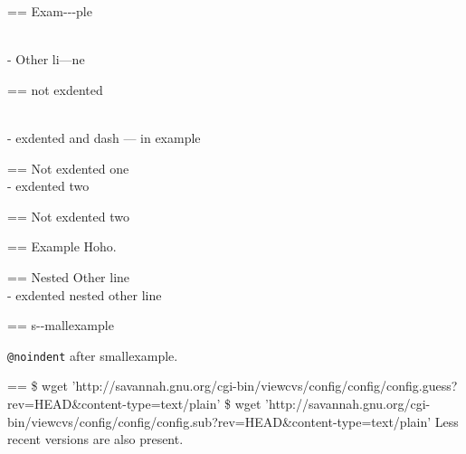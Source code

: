 \documentclass{book}
\makeatletter
\newenvironment{Texinfopreformatted}{%
  \par\GNUTobeylines\obeyspaces\frenchspacing\parskip=\z@\parindent=\z@}{}
{\catcode`\^^M=13 \gdef\GNUTobeylines{\catcode`\^^M=13 \def^^M{\null\par}}}
\newenvironment{Texinfoindented}{\begin{list}{}{}\item\relax}{\end{list}}
\renewcommand{\_}{\Texinfounderscore\discretionary{}{}{}}
\makeatother
\begin{document}
\begin{titlepage}
\begin{Texinfoindented}
\begin{Texinfopreformatted}%
\ttfamily Exam{-}{-}{-}ple

\end{Texinfopreformatted}
\leavevmode{}\\
\hbox{\kern -\leftmargin}%
Other li---ne
\\
\begin{Texinfopreformatted}%
\ttfamily not exdented
\end{Texinfopreformatted}
\end{Texinfoindented}

\begin{Texinfoindented}
\leavevmode{}\\
\hbox{\kern -\leftmargin}%
exdented  and dash --- in example
\\
\begin{Texinfopreformatted}%
\ttfamily Not exdented one
\end{Texinfopreformatted}
\leavevmode{}\\
\hbox{\kern -\leftmargin}%
exdented two
\\
\begin{Texinfopreformatted}%
\ttfamily Not exdented two
\end{Texinfopreformatted}
\end{Texinfoindented}

\begin{Texinfoindented}
\begin{Texinfopreformatted}%
\ttfamily Example   Hoho.
\end{Texinfopreformatted}
\begin{Texinfoindented}
\begin{Texinfopreformatted}%
\ttfamily Nested Other line
\end{Texinfopreformatted}
\leavevmode{}\\
\hbox{\kern -\leftmargin}%
exdented nested other line
\\
\end{Texinfoindented}
\end{Texinfoindented}

\begin{Texinfopreformatted}%
\ttfamily \footnotesize s{-}{-}mallexample
\end{Texinfopreformatted}

\texttt{@noindent} after smallexample.
\begin{Texinfopreformatted}%
\ttfamily \footnotesize \$ wget 'http://savannah.gnu.org/cgi-bin/viewcvs/config/config/config.guess?rev=HEAD\&content-type=text/plain'
\$ wget 'http://savannah.gnu.org/cgi-bin/viewcvs/config/config/config.sub?rev=HEAD\&content-type=text/plain'
\end{Texinfopreformatted}
\noindent{}Less recent versions are also present.


\end{titlepage}
\end{document}

